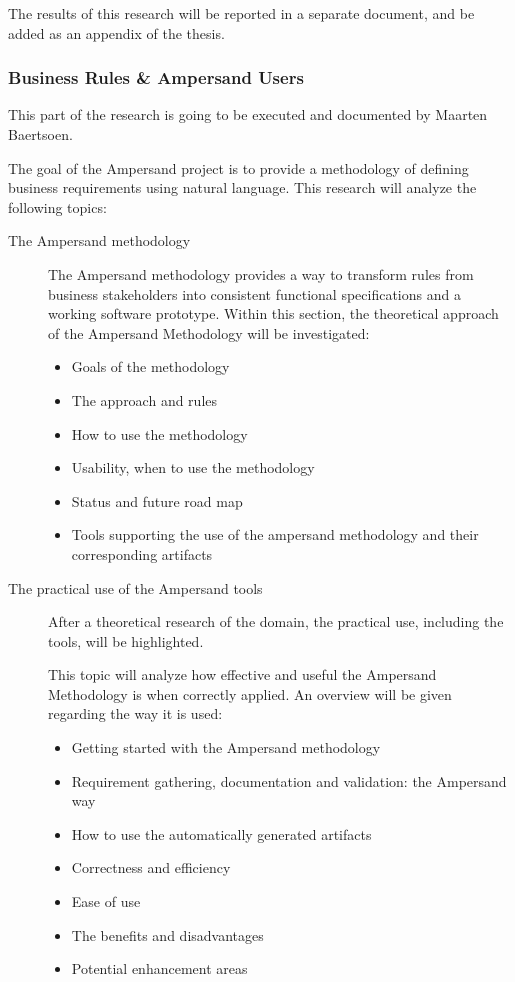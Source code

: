 \noindent
The results of this research will be reported in a separate document, and be added as an appendix of the thesis.

\subsubsection{Business Rules \& Ampersand Users}
This part of the research is going to be executed and documented by Maarten Baertsoen.

The goal of the Ampersand project is to provide a methodology of defining business requirements using natural language.
This research will analyze the following topics:

\begin{description}
	\item [The Ampersand methodology ]
	The Ampersand methodology provides a way to transform rules from business stakeholders into consistent functional specifications and a working software prototype.
	Within this section, the theoretical approach of the Ampersand Methodology will be investigated:
	\begin{itemize}
		\item Goals of the methodology
		\item The approach and rules
		\item How to use the methodology
		\item Usability, when to use the methodology
		\item Status and future road map
		\item Tools supporting the use of the ampersand methodology and their corresponding artifacts
	\end{itemize}
	
	\item [The practical use of the Ampersand tools]
	After a theoretical research of the domain, the practical use, including the tools, will be highlighted.
	
	This topic will analyze how effective and useful the Ampersand Methodology is when correctly applied.
	An overview will be given regarding the way it is used:
	\begin{itemize}
		\item Getting started with the Ampersand methodology
		\item Requirement gathering, documentation and validation: the Ampersand way
		\item How to use the automatically generated artifacts
		\item Correctness and efficiency
		\item Ease of use
		\item The benefits and disadvantages
		\item Potential enhancement areas
	\end{itemize}
	
\end{description}

